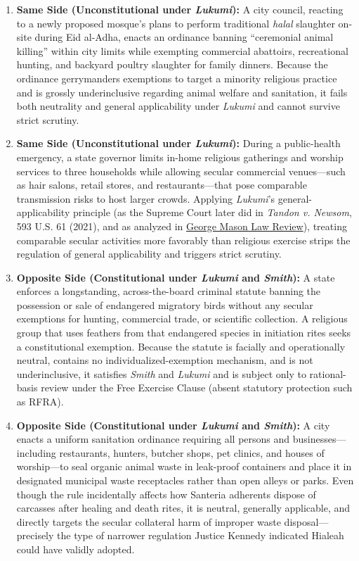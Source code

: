 \documentclass[12pt]{article}
\begin{document}
\begin{enumerate}
  \item \textbf{Same Side (Unconstitutional under \textit{Lukumi}):} A city council, reacting to a newly proposed mosque's plans to perform traditional \textit{halal} slaughter on-site during Eid al-Adha, enacts an ordinance banning ``ceremonial animal killing'' within city limits while exempting commercial abattoirs, recreational hunting, and backyard poultry slaughter for family dinners. Because the ordinance gerrymanders exemptions to target a minority religious practice and is grossly underinclusive regarding animal welfare and sanitation, it fails both neutrality and general applicability under \textit{Lukumi} and cannot survive strict scrutiny.

  \item \textbf{Same Side (Unconstitutional under \textit{Lukumi}):} During a public-health emergency, a state governor limits in-home religious gatherings and worship services to three households while allowing secular commercial venues---such as hair salons, retail stores, and restaurants---that pose comparable transmission risks to host larger crowds. Applying \textit{Lukumi}'s general-applicability principle (as the Supreme Court later did in \textit{Tandon v. Newsom}, 593 U.S. 61 (2021), and as analyzed in \href{https://lawreview.gmu.edu/print__issues/religious-and-secular-comparators/}{George Mason Law Review}), treating comparable secular activities more favorably than religious exercise strips the regulation of general applicability and triggers strict scrutiny.

  \item \textbf{Opposite Side (Constitutional under \textit{Lukumi} and \textit{Smith}):} A state enforces a longstanding, across-the-board criminal statute banning the possession or sale of endangered migratory birds without any secular exemptions for hunting, commercial trade, or scientific collection. A religious group that uses feathers from that endangered species in initiation rites seeks a constitutional exemption. Because the statute is facially and operationally neutral, contains no individualized-exemption mechanism, and is not underinclusive, it satisfies \textit{Smith} and \textit{Lukumi} and is subject only to rational-basis review under the Free Exercise Clause (absent statutory protection such as RFRA).

  \item \textbf{Opposite Side (Constitutional under \textit{Lukumi} and \textit{Smith}):} A city enacts a uniform sanitation ordinance requiring all persons and businesses---including restaurants, hunters, butcher shops, pet clinics, and houses of worship---to seal organic animal waste in leak-proof containers and place it in designated municipal waste receptacles rather than open alleys or parks. Even though the rule incidentally affects how Santeria adherents dispose of carcasses after healing and death rites, it is neutral, generally applicable, and directly targets the secular collateral harm of improper waste disposal---precisely the type of narrower regulation Justice Kennedy indicated Hialeah could have validly adopted.


\end{enumerate}
\end{document}
